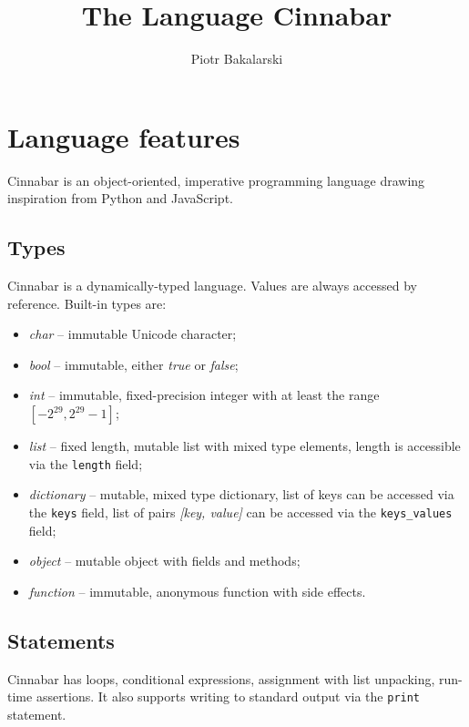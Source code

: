 \documentclass[a4paper,11pt]{article}
\author{Piotr Bakalarski}
\title{The Language Cinnabar}
\begin{document}
\maketitle

\newcommand{\emptyP}{\mbox{$\epsilon$}}
\newcommand{\terminal}[1]{\mbox{{\texttt {#1}}}}
\newcommand{\nonterminal}[1]{\mbox{$\langle \mbox{{\sl #1 }} \! \rangle$}}
\newcommand{\arrow}{\mbox{::=}}
\newcommand{\delimit}{\mbox{$|$}}
\newcommand{\reserved}[1]{\mbox{{\texttt {#1}}}}
\newcommand{\literal}[1]{\mbox{{\texttt {#1}}}}
\newcommand{\symb}[1]{\mbox{{\texttt {#1}}}}

\section*{Language features}

Cinnabar is an object-oriented, imperative programming language drawing inspiration from Python and JavaScript. 

\subsection*{Types}

Cinnabar is a dynamically-typed language. Values are always accessed by reference. Built-in types are:
\begin{itemize}
\item \emph{char} -- immutable Unicode character;
\item \emph{bool} -- immutable, either \emph{true} or \emph{false};
\item \emph{int} -- immutable, fixed-precision integer with at least the range
$\left[ -2^{29}, 2^{29}-1 \right]$;
\item \emph{list} -- fixed length, mutable list with mixed type elements, length is accessible via the {\tt length} field;
\item \emph{dictionary} -- mutable, mixed type dictionary, list of keys can be accessed via the {\tt keys} field, list of pairs \emph{[key, value]} can be accessed via the {\tt keys\_values} field;
\item \emph{object} -- mutable object with fields and methods;
\item \emph{function} -- immutable, anonymous function with side effects.
\end{itemize} 

\subsection*{Statements}
Cinnabar has loops, conditional expressions, assignment with list unpacking, run-time assertions. It also supports writing to standard output via the {\tt print} statement.
\end{document}
